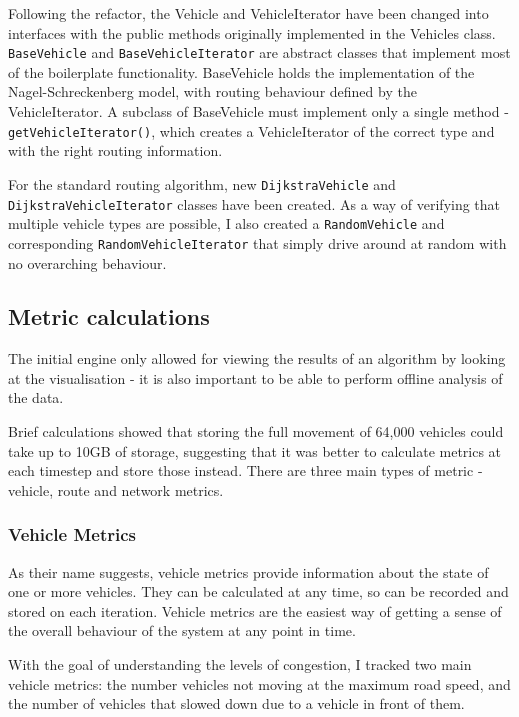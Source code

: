 \documentclass[ %
                    author={Alexander Hill},
                supervisor={Dr. Benjamin Sach},
                    degree={MEng},
                     title={MARMOSET},
                  subtitle={Multi-Agent Route Management using Online Simulation for Efficient Transportation},
                      type={research},
                      year={2016} ]{dissertation}
\begin{document}
Following the refactor, the Vehicle and VehicleIterator have been changed into
interfaces with the public methods originally implemented in the Vehicles class.
\texttt{BaseVehicle} and \texttt{BaseVehicleIterator} are abstract classes that
implement most of the boilerplate functionality. BaseVehicle holds the
implementation of the Nagel-Schreckenberg model, with routing behaviour defined
by the VehicleIterator. A subclass of BaseVehicle must implement only a single
method - \texttt{getVehicleIterator()}, which creates a VehicleIterator of the
correct type and with the right routing information.

For the standard routing algorithm, new \texttt{DijkstraVehicle} and
\texttt{DijkstraVehicleIterator} classes have been created. As a way of
verifying that multiple vehicle types are possible, I also created a
\texttt{RandomVehicle} and corresponding \texttt{RandomVehicleIterator} that
simply drive around at random with no overarching behaviour.

\subsection{Metric calculations}

The initial engine only allowed for viewing the results of an algorithm by
looking at the visualisation - it is also important to be able to perform
offline analysis of the data.

Brief calculations showed that storing the full movement of 64,000 vehicles
could take up to 10GB of storage, suggesting that it was better to calculate
metrics at each timestep and store those instead. There are three main types of
metric - vehicle, route and network metrics.

\subsubsection{Vehicle Metrics}

As their name suggests, vehicle metrics provide information about the state of
one or more vehicles. They can be calculated at any time, so can be recorded and
stored on each iteration. Vehicle metrics are the easiest way of getting a sense
of the overall behaviour of the system at any point in time.

With the goal of understanding the levels of congestion, I tracked two main
vehicle metrics: the number vehicles not moving at the maximum road speed, and
the number of vehicles that slowed down due to a vehicle in front of them.
\end{document}
